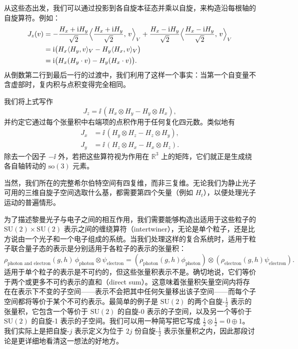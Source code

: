从这些态出发，我们可以通过投影到各自旋本征态并乘以自旋，来构造沿每根轴的自旋算符。例如：
\begin{align*}
J_z(v)
&= -\frac{H_x+\mathrm{i} H_y}{\sqrt2}\Bigl\langle\frac{H_x+\mathrm{i} H_y}{\sqrt2},\,v\Bigr\rangle_V
+\frac{H_x-\mathrm{i} H_y}{\sqrt2}\Bigl\langle\frac{H_x-\mathrm{i} H_y}{\sqrt2},\,v\Bigr\rangle_V\\
&= \mathrm{i}\bigl(H_x\langle H_y,v\rangle_V-H_y\langle H_x,v\rangle_V\bigr)\\
&= \mathrm{i}\bigl(H_x(H_y\cdot v)-H_y(H_x\cdot v)\bigr).
\end{align*}
从倒数第二行到最后一行的过渡中，我们利用了这样一个事实：当第一个自变量不含虚部时，复内积与点积变得完全相同。

我们将上式写作
\begin{equation*}
J_z=\ii\,(H_x\otimes H_y-H_y\otimes H_x),
\end{equation*}
并约定它通过每个张量积中右端项的点积作用于任何复化四元数。类似地有
\begin{align*}
J_x &= \ii\,(H_y\otimes H_z-H_z\otimes H_y),\\
J_y &= \ii\,(H_z\otimes H_x-H_x\otimes H_z).
\end{align*}
除去一个因子 $-\ii$ 外，若把这些算符视为作用在 $\mathbb{R}^{3}$ 上的矩阵，它们就正是生成绕各自轴转动的 $\mathrm{so}(3)$ 元素。

当然，我们所在的完整希尔伯特空间有四复维，而非三复维。无论我们为静止光子可用的三维自旋子空间选取什么基，都需要第四个矢量（例如 $H_t$），以便处理光子运动的普遍情形。

为了描述黎曼光子与电子之间的相互作用，我们需要能够构造出适用于这些粒子的 $\mathrm{SU}(2)\times\mathrm{SU}(2)$ 表示之间的缠绕算符（intertwiner），无论是单个粒子，还是比方说由一个光子和一个电子组成的系统。当我们处理这样的复合系统时，适用于粒子联合量子态的表示是分别适用于各粒子的表示的张量积：
\begin{equation*}
\rho_{\text{photon and electron}}(g,h)\,\phi_{\text{photon}}\otimes\psi_{\text{electron}}
=(\rho_{\text{photon}}(g,h)\phi_{\text{photon}})\otimes(\rho_{\text{electron}}(g,h)\psi_{\text{electron}}).
\end{equation*}
适用于单个粒子的表示是不可约的，但这些张量积表示不是。确切地说，它们等价于两个或更多不可约表示的直和（direct sum）。这意味着张量积矢量空间内将存在在表示下不变的子空间——表示不会把其中任何矢量移出该子空间——而每个子空间都将等价于某个不可约表示。最简单的例子是 $\mathrm{SU}(2)$ 的两个自旋-$\tfrac12$ 表示的张量积，它包含一个等价于 $\mathrm{SU}(2)$ 的自旋-0 表示的子空间，以及另一个等价于 $\mathrm{SU}(2)$ 的自旋-1 表示的子空间。我们可以用一种简写把它写成 $\tfrac12\otimes\tfrac12=0\oplus1$。我们实际上是把自旋-$j$ 表示定义为位于 $2j$ 份自旋-$\tfrac12$ 表示张量积之内，因此那段讨论是更详细地看清这一想法的好地方。

